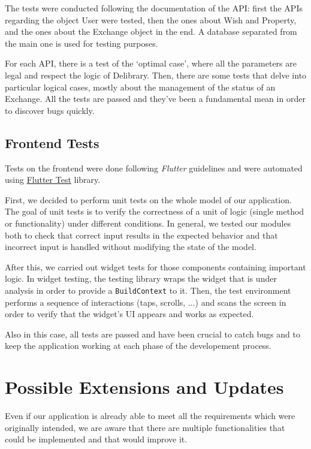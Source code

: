 The tests were conducted following the documentation of the API: first the APIs regarding the object User were tested, then the ones about Wish and Property, and the ones about the Exchange object in the end.
A database separated from the main one is used for testing purposes.

For each API, there is a test of the `optimal case', where all the parameters are legal and respect the logic of Delibrary.
Then, there are some tests that delve into particular logical cases, mostly about the management of the status of an Exchange.
All the tests are passed and they've been a fundamental mean in order to discover bugs quickly.

\section{Frontend Tests}
Tests on the frontend were done following \textit{Flutter} guidelines and were automated using \href{https://api.flutter.dev/flutter/flutter_test/flutter_test-library.html}{Flutter Test} library.

First, we decided to perform unit tests on the whole model of our application.
The goal of unit tests is to verify the correctness of a unit of logic (single method or functionality) under different conditions.
In general, we tested our modules both to check that correct input results in the expected behavior and that incorrect input is handled without modifying the state of the model.

After this, we carried out widget tests for those components containing important logic.
In widget testing, the testing library wraps the widget that is under analysis in order to provide a \texttt{BuildContext} to it.
Then, the test environment performs a sequence of interactions (taps, scrolls, ...) and scans the screen in order to verify that the widget's UI appears and works as expected.

Also in this case, all tests are passed and have been crucial to catch bugs and to keep the application working at each phase of the developement process.



\chapter{Possible Extensions and Updates}
Even if our application is already able to meet all the requirements which were originally intended, we are aware that there are multiple functionalities that could be implemented and that would improve it.

